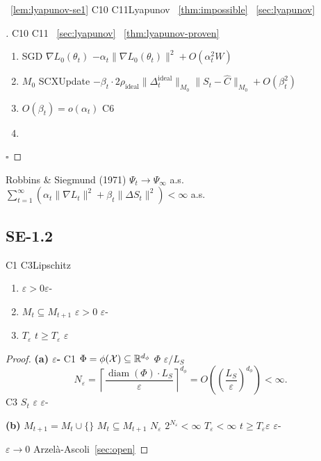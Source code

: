 \textbf{}~\ref{lem:lyapunov-se1}  C10 C11\textbf{}Lyapunov ~\ref{thm:impossible} ~\ref{sec:lyapunov} 

\begin{proof}[]
 C10  C11 ~\ref{sec:lyapunov} ~\ref{thm:lyapunov-proven}
\begin{enumerate}[nosep]
    \item  SGD  $\nabla L_0(\theta_t)$  $-\alpha_t \|\nabla L_0(\theta_t)\|^2 + O(\alpha_t^2 W)$
    \item  $M_0$  SCXUpdate  $-\beta_t \cdot 2\rho_{\text{ideal}} \|\Delta_t^{\text{ideal}}\|_{M_0} \|S_t - \hat{C}\|_{M_0} + O(\beta_t^2)$
    \item $O(\beta_t) = o(\alpha_t)$  C6 
    \item 
    \end{enumerate}
\hfill $\square$
\end{proof}

 Robbins \& Siegmund (1971) $\Psi_t \to \Psi_\infty$ a.s.\  $\sum_{t=1}^\infty (\alpha_t \|\nabla L_t\|^2 + \beta_t \|\Delta S_t\|^2) < \infty$ a.s.

\subsection{ SE-1.2}

\begin{lemma}[]\label{lem:memory-stab}
 C1 C3Lipschitz 
\begin{enumerate}[label=(\alph*), nosep]
    \item  $\varepsilon > 0$$\varepsilon$-
    \item $M_t \subseteq M_{t+1}$ $\varepsilon > 0$  $\varepsilon$-
    \item  $T_\varepsilon$  $t \geq T_\varepsilon$ $\varepsilon$ 
\end{enumerate}
\end{lemma}

\begin{proof}
\textbf{(a) $\varepsilon$-}  C1  $\Phi = \phi(\mathcal{X}) \subseteq \mathbb{R}^{d_\phi}$ $\Phi$  $\varepsilon/L_S$ 
\begin{equation}
    N_\varepsilon = \left\lceil\frac{\operatorname{diam}(\Phi) \cdot L_S}{\varepsilon}\right\rceil^{d_\phi} = O\left(\left(\frac{L_S}{\varepsilon}\right)^{d_\phi}\right) < \infty.
\end{equation}
 C3 $S_t$  $\varepsilon$ $\varepsilon$-

\textbf{(b) } $M_{t+1} = M_t \cup \{\text{}\}$ $M_t \subseteq M_{t+1}$ $N_\varepsilon$  $2^{N_\varepsilon} < \infty$ $T_\varepsilon < \infty$  $t \geq T_\varepsilon$$\varepsilon$  $\varepsilon$-

\textbf{}$\varepsilon \to 0$ Arzel\`{a}-Ascoli~\ref{sec:open} 
\end{proof}

